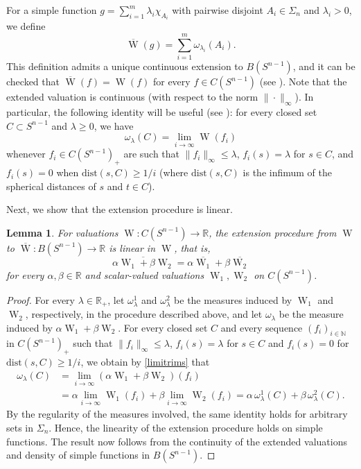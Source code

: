 \documentclass[11pt, a4paper]{amsart}
\newtheorem{lemma}[proposition]{Lemma}
\newcommand{\dist}{\mbox{dist}}
\newcommand{\sn}{{S^{n-1}}}
\newcommand{\oW}{\operatorname{W}}
\newcommand{\cfn}{C(\sn )_{\scriptscriptstyle +}}
\newcommand{\R}{\mathbb R}
\begin{document}
For a simple function $g=\sum_{i=1}^m \lambda_i\chi_{A_i}$ with pairwise disjoint $A_i\in \Sigma_n$ and $\lambda_i >0$, we define 
$$\overline{\oW}(g)=\sum_{i=1}^m\omega_{\lambda_i}(A_i).$$ 
This definition admits a unique continuous extension to $B(\sn )$, and it can be checked that 
$\overline{\oW}(f)=\oW(f)$ for every $f\in C(\sn )$ (see \cite[Theorem~6.1]{TrViJMAA}). Note that the extended valuation is continuous (with respect to the norm $\|\cdot\|_{\scriptscriptstyle \infty}$). In particular, the following identity will be useful (see \cite[Lemma~5.6]{TrViJMAA}): for every closed set $C\subset \sn $ and $\lambda \ge 0$, we have
\begin{equation}\label{limitrims}
\omega_{\lambda}(C)=\lim_{i\to \infty}  \oW(f_i)
\end{equation}
whenever $f_i\in \cfn$ are such that $\|f_i\|_{\scriptscriptstyle \infty}\leq \lambda$,  $f_i(s)=\lambda$ for $s\in C$, and $f_i(s)=0$ when $\dist(s,C)\geq1/i$ (where $\dist(s,C)$ is the infimum of the spherical distances of $s$ and $t\in C$).

\goodbreak
Next, we show that the extension procedure is linear. 

\goodbreak
\begin{lemma}\label{l:ABextension}
For valuations $\oW\colon C(\sn )\to \R$, the extension procedure from $\oW$ to $\overline{\oW}\colon B(\sn )\to \R$ is linear in $\oW$, that is, 
$$\overline{\alpha \oW_1+\beta \oW_2}=\alpha \overline{\oW_1}+ \beta \overline{\oW_2}$$
for every $\alpha, \beta \in \R$ and scalar-valued valuations $\oW_1, \oW_2$ on $C(\sn)$.
\end{lemma}
\begin{proof}
For every $\lambda \in \R_{\scriptscriptstyle +}$, let $\omega^1_\lambda$ and $\omega^2_\lambda$ be the measures induced by $\oW_1$ and $\oW_2$, respectively, in the procedure described above, and let $\omega_\lambda$ be the measure induced by $\alpha \oW_1+\beta \oW_2$. For every closed set $C$ and every sequence $(f_i)_{i\in\mathbb N}$ in $\cfn$ such that  $\|f_i\|_{\scriptscriptstyle \infty}\leq \lambda$, $f_i(s)=\lambda$ for $s\in C$ and $f_i(s)=0$ for $\dist(s,C)\geq1/i$, we obtain by \eqref{limitrims} that
\begin{align*}
\omega_\lambda(C)&=\lim_{i\rightarrow \infty} (\alpha \oW_1+\beta \oW_2)(f_i)\\ &=\alpha \lim_{i\rightarrow \infty} \oW_1(f_i)+\beta \lim_{i\rightarrow \infty} \oW_2(f_i)=\alpha\, \omega^1_\lambda(C)+\beta\, \omega^2_\lambda(C).
\end{align*}
By the regularity of the measures involved, the same identity holds for arbitrary sets in $\Sigma_n$. Hence, the linearity of the extension procedure holds on simple functions. The result now follows from the continuity of the extended valuations and density of simple functions in $B(\sn)$.
\end{proof}
\end{document}
